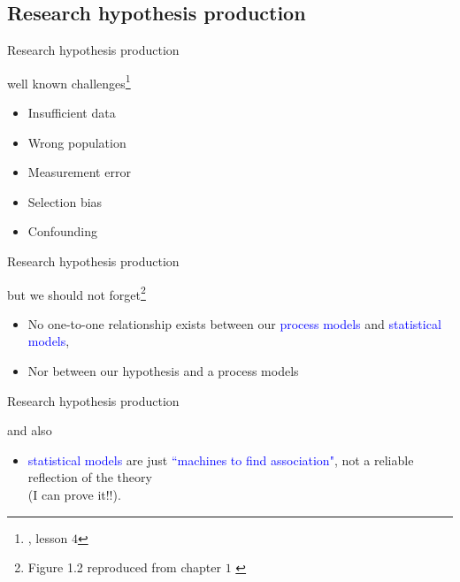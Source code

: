 \subsection{Research hypothesis production}
%
%
\begin{frame}[t, negative]
	\subsectionpage
\end{frame}
%
%
\begin{lhframe}[rhgraphic={\texttt{[image: challenges.jpg]}}]
	{Research hypothesis production}
	
	well known challenges\footnote{\citet{Hernan_2020}, lesson $4$}
	\begin{itemize}
		\item Insufficient data
		\item Wrong population
		\item Measurement error
		\item Selection bias
		\item Confounding
	\end{itemize} 
\end{lhframe}
%
%
\begin{lhframe}[rhgraphic={\texttt{[image: process\_models.png]}}]
	{Research hypothesis production}
	
	but we should not forget\footnote{Figure 1.2 reproduced from chapter $1$ \citet{McElreath_2022}}
	\begin{itemize}
		\item No one-to-one relationship exists between our \textcolor{blue}{process models} and \textcolor{blue}{statistical models},
		\item Nor between our hypothesis and a process models
	\end{itemize} 
\end{lhframe}
%
%
\begin{lhframe}[rhgraphic={\texttt{[image: tide\_machine.jpg]}}]
	{Research hypothesis production}
	
	and also
	\begin{itemize}
		\item \textcolor{blue}{statistical models} are just \textcolor{blue}{``machines to find association"}, not a reliable reflection of the theory \\
		\alert{(I can prove it!!)}.
	\end{itemize} 
\end{lhframe}
%
%
